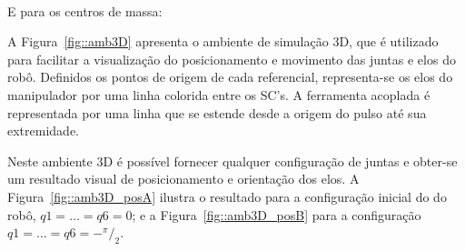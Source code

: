\bigskip {} \\
 \bigskip 

E para os centros de massa:

\bigskip {} \bigskip 

A Figura~\ref{fig::amb3D} apresenta o ambiente de simulação 3D, que é utilizado
para facilitar a visualização do posicionamento e movimento das juntas e elos do
robô. Definidos os pontos de origem de cada referencial, representa-se os elos
do manipulador por uma linha colorida entre os SC's. A ferramenta acoplada é
representada por uma linha que se estende desde a origem do pulso até sua
extremidade.

Neste ambiente 3D é possível fornecer qualquer configuração de juntas e
obter-se um resultado visual de posicionamento e orientação dos elos. A
Figura~\ref{fig::amb3D_posA} ilustra o resultado para a configuração inicial do
do robô, $q1 = \ldots = q6 = 0$; e a Figura~\ref{fig::amb3D_posB} para a
configuração $q1 = \ldots = q6 = {-}^{\pi}/_2$.

